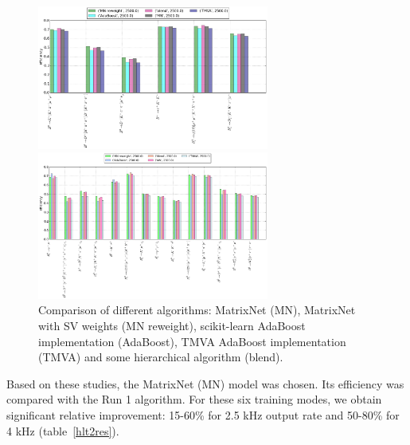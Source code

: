 \documentclass[a4paper]{jpconf}
\begin{document}
\begin{figure}[h]
\begin{minipage}{18pc}
\includegraphics[width=18pc]{../images/blend}
\end{minipage}\hspace{2pc}%
\begin{minipage}{18pc}
\includegraphics[width=18pc]{../images/hlt_mns}
\end{minipage} 
\caption{\label{hlt2_blend} Comparison of different algorithms: MatrixNet (MN), MatrixNet with SV weights (MN reweight), scikit-learn AdaBoost implementation (AdaBoost), TMVA AdaBoost implementation (TMVA) and some hierarchical algorithm (blend).}
\end{figure}

Based on these studies, the MatrixNet (MN) model was chosen. Its efficiency was compared with the Run 1 algorithm. For these six training modes, we obtain significant relative improvement: 15-60\% for 2.5 kHz output rate and 50-80\% for 4 kHz (table~\ref{hlt2res}).
\end{document}
